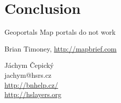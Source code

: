 \documentclass[xcolor=dvipsnames]{beamer}
\begin{document}
\section*{Conclusion}
\begin{frame}
\begin{block}{Geoportals}
Map portals do not work 
\end{block}
Brian Timoney, \url{http://mapbrief.com}
\end{frame}


\begin{frame}
    \begin{center}
        Jáchym Čepický \\
        jachym@hsrs.cz \\
        \url{http://bnhelp.cz/} \\
        \url{http://hslayers.org}
    \end{center}
\end{frame}
\end{document}
